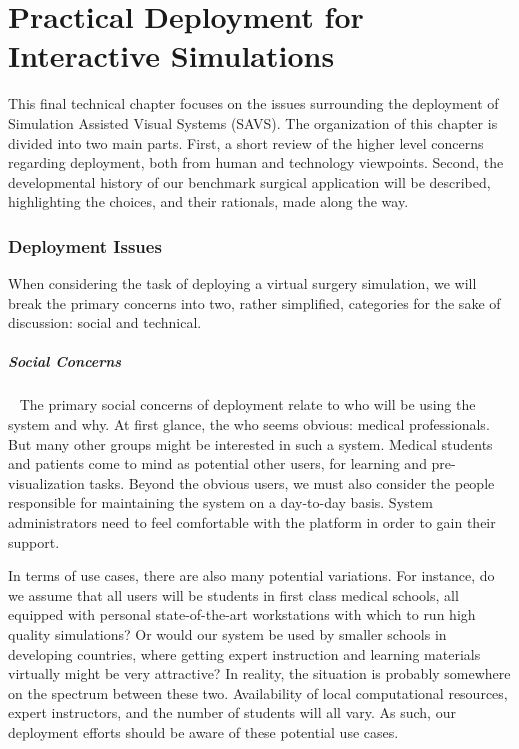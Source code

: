 \chapter{Practical Deployment for Interactive Simulations}
\label{chp:deployment}

This final technical chapter focuses on the issues surrounding
the deployment of Simulation Assisted Visual Systems (SAVS). The
organization of this chapter is divided into two main parts. First, a
short review of the higher level concerns regarding deployment, both
from human and technology viewpoints. Second, the developmental
history of our benchmark surgical application will be described,
highlighting the choices, and their rationals, made along the way.

\subsection{Deployment Issues}

When considering the task of deploying a virtual surgery simulation,
we will break the primary concerns into two, rather simplified,
categories for the sake of discussion: social and technical.

\paragraph{Social Concerns}~ The primary social concerns of deployment
relate to who will be using the system and why. At first glance, the
who seems obvious: medical professionals. But many other groups might be interested
in such a system. Medical students and patients come to mind as
potential other users, for learning and pre-visualization
tasks. Beyond the obvious users, we must also consider the people
responsible for maintaining the system on a day-to-day basis. System
administrators need to feel comfortable with the platform in order to
gain their support.

In terms of use cases, there are also many potential variations. For
instance, do we assume that all users will be students in first class
medical schools, all equipped with personal state-of-the-art
workstations with which to run high quality simulations? Or would our
system be used by smaller schools in developing countries, where
getting expert instruction and learning materials virtually might be
very attractive? In reality, the situation is probably somewhere on
the spectrum between these two. Availability of local computational
resources, expert instructors, and the number of students will all
vary. As such, our deployment efforts should be aware of these
potential use cases.

